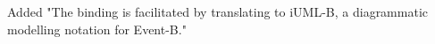 \documentclass{response}
\begin{document}
\begin{response}
\end{response}

\begin{comment}{Reviewer \#2}
  In addition, I would have liked a more formal description of the
  translation, or at least a reference to a more formal description of
  the translation than the prose description of different model
  aspects.  
\end{comment}

\begin{response}
\end{response}





\begin{comment}{Reviewer \#3}
  Page 1:

  * Line -2, it says:

  "While functional properties (usually) can be tested, safety,
  security and reliability properties
  (usually) must be proved formally."

  "Can" ... and ... "must" ... why?
\end{comment}

\begin{response}
\end{response}

\begin{comment}{Reviewer \#3}
  Page 2:

  * Top: The first paragraph can be expressed more clearly. That is:
  what is the approach taken? Is UML state charts mapped to iUML-B or
  not?
\end{comment}

\begin{response}
Added "The binding is facilitated by translating to iUML-B, a diagrammatic modelling notation for Event-B."
\end{response}
\end{document}
